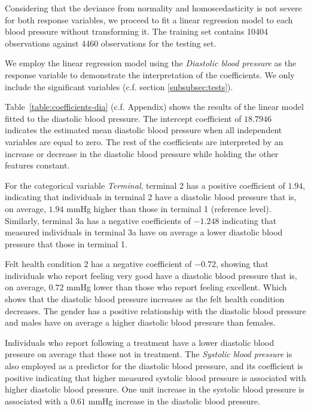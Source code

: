 \documentclass[12 pt]{scrartcl}
\numberwithin{equation}{section}
\begin{document}
Considering that the deviance from normality and homoscedasticity is not severe for both response variables, 
we proceed to fit a linear regression model to each blood pressure without transforming it.
The training set contains 10404 observations against 4460 observations for the testing set. 

We employ the linear regression model using the \textit{Diastolic blood pressure} as the response variable 
to demonstrate the interpretation of the coefficients. We only include the significant variables (c.f. section \ref{subsubsec:tests}).

Table~\ref{table:coefficients-dia} (c.f. Appendix) 
shows the results of the linear model fitted to the diastolic blood pressure.
The intercept coefficient of $18.7946$ indicates the estimated mean
diastolic blood pressure when all independent variables are equal to zero.
The rest of the coefficients are interpreted by an increase or decrease in the diastolic blood pressure
while holding the other features constant.

For the categorical variable \textit{Terminal},
terminal 2 has a positive coefficient of $1.94$, indicating that individuals 
in terminal 2 have a diastolic blood pressure that is, on average, $1.94$ mmHg higher than those in terminal 1 (reference level).
Similarly, terminal 3a has a negative coefficients of $-1.248$ indicating 
that measured individuals in terminal 3a have on average a lower diastolic blood pressure that those in terminal 1.

Felt health condition 2 has a negative coefficient of $-0.72$, showing 
that individuals who report feeling very good have a diastolic blood pressure that is, 
on average, $0.72$ mmHg lower than those who report feeling excellent.
Which shows that the diastolic blood pressure increases as the felt health condition decreases.
The gender has a positive relationship with the diastolic blood pressure and 
males have on average a higher diastolic blood pressure than females.

Individuals who report following a treatment have a lower diastolic blood pressure on average that those not in treatment.
The \textit{Systolic blood pressure} is also employed as a predictor for the diastolic blood pressure, and its coefficient is positive
indicating that higher measured systolic blood pressure is associated with higher diastolic blood pressure.
One unit increase in the systolic blood pressure is associated with a $0.61$ mmHg increase in the diastolic blood pressure.
\end{document}
